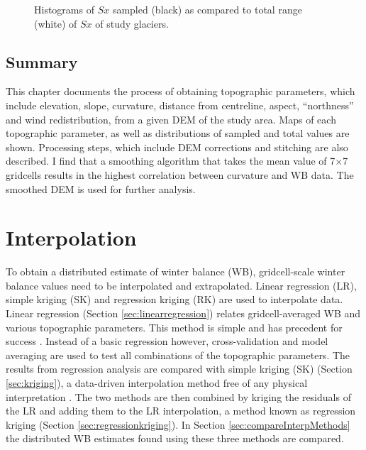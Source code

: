 \documentclass{sfuthesis}
\begin{document}
\begin{figure}[H]
	\caption{Histograms of $Sx$ sampled (black) as compared to total range (white) of $Sx$ of study glaciers.}
	\label{sampledRange:Sx}
\end{figure}


\section{Summary}

This chapter documents the process of obtaining topographic parameters, which include elevation, slope, curvature, distance from centreline, aspect, ``northness'' and wind redistribution, from a given DEM of the study area. Maps of each topographic parameter, as well as distributions of sampled and total values are shown. Processing steps, which include DEM corrections and stitching are also described. I find that a smoothing algorithm that takes the mean value of 7$\times$7 gridcells results in the highest correlation between curvature and WB data. The smoothed DEM is used for further analysis. 



\chapter{Interpolation}

To obtain a distributed estimate of winter balance (WB), gridcell-scale winter balance values need to be interpolated and extrapolated. Linear regression (LR), simple kriging (SK) and regression kriging (RK) are used to interpolate data. Linear regression (Section \ref{sec:linearregression}) relates gridcell-averaged WB and various topographic parameters. This method is simple and has precedent for success \citep[e.g.][]{McGrath2015}. Instead of a basic regression however, cross-validation and model averaging are used to test all combinations of the topographic parameters. The results from regression analysis are compared with simple kriging (SK) (Section \ref{sec:kriging}), a data-driven interpolation method free of any physical interpretation \citep[e.g.][]{Hock1999}. The two methods are then combined by kriging the residuals of the LR and adding them to the LR interpolation, a method known as regression kriging (Section \ref{sec:regressionkriging}). In Section \ref{sec:compareInterpMethods} the distributed WB estimates found using these three methods are compared.
\end{document}
